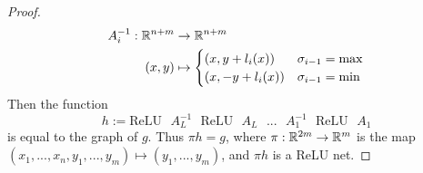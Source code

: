 \begin{proof}
\begin{align*}
    A_i^{-1}: \mathbb{R}^{n + m} &\to \mathbb{R}^{n + m}\\
    (x,y) &\mapsto 
    \begin{cases}
    (x, y + l_i(x))& \sigma_{i-1} = \operatorname{max}\\
    (x, -y + l_i(x))& \sigma_{i-1} = \operatorname{min}
    \end{cases}
\end{align*}
Then the function
\[h := \text{ReLU}\text{ }A_{L}^{-1}\text{ }\text{ReLU}\text{ }A_L\text{ }...\text{ }A_1^{-1}\text{ }\text{ReLU}\text{ }A_1\]
is equal to the graph of $g$. Thus $\pi h = g$, where $\pi: \mathbb{R}^{2m} \to \mathbb{R}^m$ is the map $(x_1,...,x_n,y_1,...,y_m) \mapsto (y_1,...,y_m)$, and $\pi h$ is a ReLU net.
\end{proof}